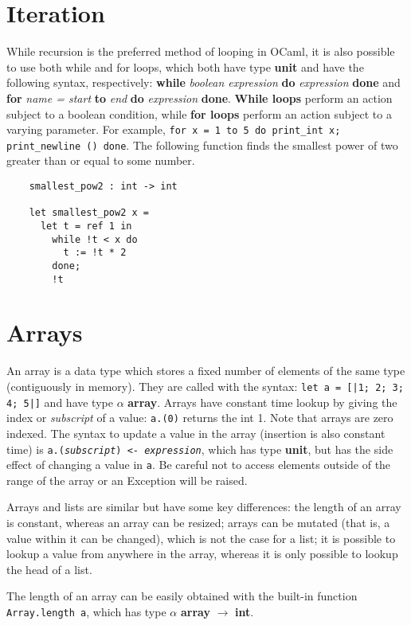 \documentclass[12pt]{article}
\begin{document}
\section{Iteration}
While recursion is the preferred method of looping in OCaml, it is also possible to use both while and for loops, which both have
type \textbf{unit} and have the following syntax, respectively: \textbf{while} \textit{boolean expression} \textbf{do} \textit{expression} \textbf{done}
and \textbf{for} \textit{name = start} \textbf{to} \textit{end} \textbf{do} \textit{expression} \textbf{done}.
\textbf{While loops} perform an action subject to a boolean condition, while \textbf{for loops} perform an action subject to
a varying parameter. For example, \texttt{for x = 1 to 5 do print\_int x; print\_newline () done}. The following function finds the smallest power of two
greater than or equal to some number.
\begin{lstlisting}
    smallest_pow2 : int -> int

    let smallest_pow2 x =
      let t = ref 1 in
        while !t < x do
          t := !t * 2
        done;
        !t
\end{lstlisting}

\section{Arrays}
An array is a data type which stores a fixed number of elements of the same type (contiguously in memory).
They are called with the syntax: \texttt{let a = [|1; 2; 3; 4; 5|]} and have type $\alpha$ \textbf{array}. Arrays have constant time lookup by giving the
index or \textit{subscript} of a value: \texttt{a.(0)} returns the int 1. Note that arrays are zero indexed. The syntax to
update a value in the array (insertion is also constant time) is \texttt{a.(\textit{subscript}) <- \textit{expression}}, which has type \textbf{unit}, but has the side effect of changing
a value in \texttt{a}. Be careful not to access elements outside of the range of the array or an Exception will be raised.

Arrays and lists are similar but have some key differences: the length of an array is constant, whereas an array can be resized; arrays can be mutated (that is, a
value within it can be changed), which is not the case for a list; it is possible to lookup a value from anywhere in the array, whereas it is only possible to
lookup the head of a list.

The length of an array can be easily obtained with the built-in function \texttt{Array.length a}, which has type $\alpha$ \textbf{array} $\rightarrow$ \textbf{int}.
\end{document}
